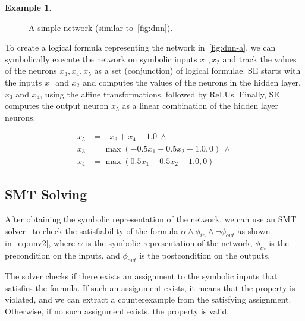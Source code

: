 \documentclass[oneside,11pt,dvipsnames]{book}
\numberwithin{equation}{section}
\theoremstyle{definition}
\newtheorem{example}{Example}[section]
\theoremstyle{remark}
\begin{document}
\begin{example}\label{ex:se-dnn}
\begin{figure}
\centering
{}
\caption{\label{fig:dnn-a}A simple network (similar to~\autoref{fig:dnn}).}
\end{figure}

To create a logical formula representing the network in~\autoref{fig:dnn-a}, we can symbolically execute the network on symbolic inputs $x_1,x_2$ and track the values of the neurons $x_3, x_4, x_5$ as a set (conjunction) of logical formulae.  SE starts with the inputs $x_1$ and $x_2$ and computes the values of the neurons in the hidden layer, $x_3$ and $x_4$, using the affine transformations, followed by ReLUs. Finally, SE computes the output neuron $x_5$ as a linear combination of the hidden layer neurons.

\begin{equation}\label{eq:se-dnn}
    \begin{split}
x_5 &= -x_3 + x_4 - 1.0 ~\land \\
x_3 &= \max(-0.5x_1 + 0.5x_2 + 1.0, 0) ~\land \\
x_4 &= \max(0.5x_1 - 0.5x_2 - 1.0, 0)
    \end{split}
\end{equation}

\end{example}

\subsection{SMT Solving}\label{sec:smt}
After obtaining the symbolic representation of the network, we can use an SMT solver~\cite{barrett2010smt} to check the satisfiability of the formula $\alpha \land \phi_{in} \land \neg \phi_{out} $ as shown in~\autoref{eq:nnv2}, where $\alpha$ is the symbolic representation of the network, $\phi_{in}$ is the precondition on the inputs, and $\phi_{out}$ is the postcondition on the outputs. 

The solver checks if there exists an assignment to the symbolic inputs that satisfies the formula. If such an assignment exists, it means that the property is violated, and we can extract a counterexample from the satisfying assignment. Otherwise, if no such assignment exists, the property is valid.
\end{document}
